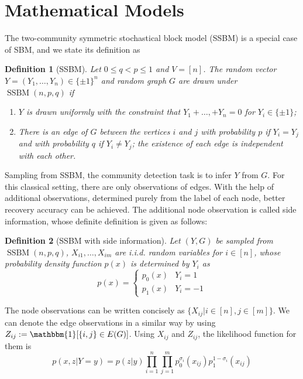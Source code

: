 \documentclass[conference]{IEEEtran}
\newtheorem{definition}{Definition}
\DeclareMathOperator{\SSBM}{SSBM}
\begin{document}
\section{Mathematical Models}
The two-community symmetric stochastical block model (SSBM) is a special case of SBM, and we state
its definition as
\begin{definition}[SSBM]
	Let $0\leq q<p\leq 1$ and $V=[n]$. The random vector $Y=(Y_1,\dots,Y_n)\in \{\pm 1\}^n$ and random graph $G$ are drawn under $\SSBM(n,p,q)$ if
	\begin{enumerate}
		\item $Y$ is drawn uniformly with the constraint that $Y_1 + \dots, + Y_n = 0$ for $Y_i \in \{\pm 1 \}$;
		
		\item There is an edge of $G$ between the vertices $i$ and $j$ with probability $p$ if $Y_i=Y_j$ and with probability $q$ if $Y_i \neq Y_j$; the existence of each edge is independent with each other.
	\end{enumerate}
\end{definition}
Sampling from SSBM, the community detection task is to infer $Y$ from $G$.
For this classical setting, there are only observations of edges. With the help of
additional observations, determined purely from the label of each node, better recovery
accuracy can be achieved. The additional node observation is called side information, whose
definite definition is given as follows:
\begin{definition}[SSBM with side information]
	Let $(Y,G)$ be sampled from $\SSBM(n,p,q)$, $X_{i1}, \dots, X_{im}$ are i.i.d. random variables for $i \in [n]$,
	whose probability density function $p(x)$ is determined by $Y_i$ as
	\begin{equation}
	p(x) = \begin{cases}
	p_0(x) & Y_i = 1 \\
	p_1(x) & Y_i = -1
	\end{cases}
	\end{equation}
\end{definition}
The node observations can be written concisely as $\{X_{ij} | i \in [n], j \in [m]\}$.
We can denote the edge observations in a similar way by using $Z_{ij}:=\mathbbm{1}[\{i,j\} \in E(G)]$.
Using $X_{ij}$ and $Z_{ij}$, the likelihood function for them is
\begin{equation}\label{eq:lh}
    p(x, z| Y=y) = p(z|y)\prod_{i=1}^n \prod_{j=1}^m p^{\sigma_i}_0(x_{ij})p^{1-\sigma_i}_1(x_{ij}) 
\end{equation}
\end{document}
